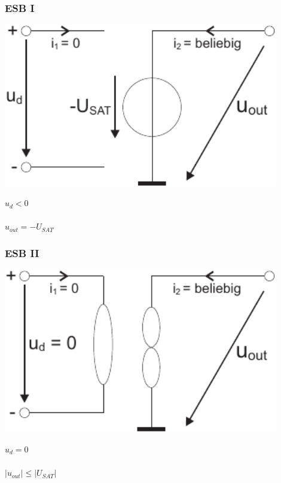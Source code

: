 \documentclass[a4paper,twocolumn,10pt]{article}
\begin{document}
\subsubsection*{ESB I}
\begin{minipage}[b]{0.3\textwidth}
\includegraphics[width=0.9\textwidth]{img/OP_ESBI}
\end{minipage}
\hfill
\begin{minipage}[b]{0.16\textwidth}
$u_d<0$\\\\
$u_{out}=-U_{SAT}$
\end{minipage}

\subsubsection*{ESB II}
\begin{minipage}[b]{0.3\textwidth}
\includegraphics[width=0.9\textwidth]{img/OP_ESBII}
\end{minipage}
\hfill
\begin{minipage}[b]{0.16\textwidth}
$u_d=0$\\\\
$|u_{out}|\leq |U_{SAT}|$
\end{minipage}
\end{document}
